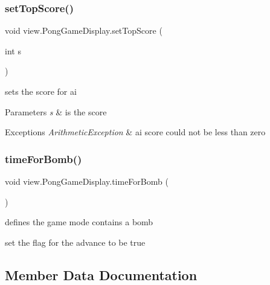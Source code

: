 \subsubsection{\texorpdfstring{set\+Top\+Score()}{setTopScore()}}
{\footnotesize\ttfamily void view.\+Pong\+Game\+Display.\+set\+Top\+Score (\begin{DoxyParamCaption}\item[{int}]{s }\end{DoxyParamCaption})}



sets the score for ai 


\begin{DoxyParams}{Parameters}
{\em s} & is the score \\
\hline
\end{DoxyParams}

\begin{DoxyExceptions}{Exceptions}
{\em Arithmetic\+Exception} & ai score could not be less than zero \\
\hline
\end{DoxyExceptions}
\hypertarget{classview_1_1_pong_game_display_a67b7b51feffc6573e92ac9c979ade0e2}{}\label{classview_1_1_pong_game_display_a67b7b51feffc6573e92ac9c979ade0e2} 
\subsubsection{\texorpdfstring{time\+For\+Bomb()}{timeForBomb()}}
{\footnotesize\ttfamily void view.\+Pong\+Game\+Display.\+time\+For\+Bomb (\begin{DoxyParamCaption}{ }\end{DoxyParamCaption})}



defines the game mode contains a bomb 

set the flag for the advance to be true 

\subsection{Member Data Documentation}
\hypertarget{classview_1_1_pong_game_display_a3aa7541f41ee227f6f7c3acf0bd35871}{}\label{classview_1_1_pong_game_display_a3aa7541f41ee227f6f7c3acf0bd35871} 
